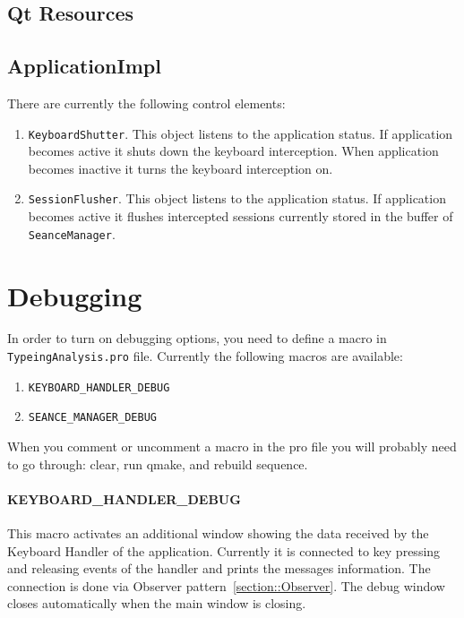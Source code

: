 \documentclass{article}
\begin{document}
\subsection{Qt Resources}

\subsection{ApplicationImpl}

There are currently the following control elements:
\begin{enumerate}
\item \verb"KeyboardShutter". This object listens to the application status. If application becomes active it shuts down the keyboard interception. When application becomes inactive it turns the keyboard interception on.

\item \verb"SessionFlusher". This object listens to the application status. If application becomes active it flushes intercepted sessions currently stored in the buffer of \verb"SeanceManager".
\end{enumerate}



\section{Debugging}\label{section::Debugging}

In order to turn on debugging options, you need to define a macro in \verb"TypeingAnalysis.pro" file. Currently the following macros are available:
\begin{enumerate}
\item \verb"KEYBOARD_HANDLER_DEBUG"
\item \verb"SEANCE_MANAGER_DEBUG"
\end{enumerate}

When you comment or uncomment a macro in the pro file you will probably need to go through: clear, run qmake, and rebuild sequence.

\paragraph{KEYBOARD\_HANDLER\_DEBUG}

This macro activates an additional window showing the data received by the Keyboard Handler of the application. Currently it is connected to key pressing and releasing events of the handler and prints the messages information. The connection is done via Observer pattern~\ref{section::Observer}. The debug window closes automatically when the main window is closing.
\end{document}
